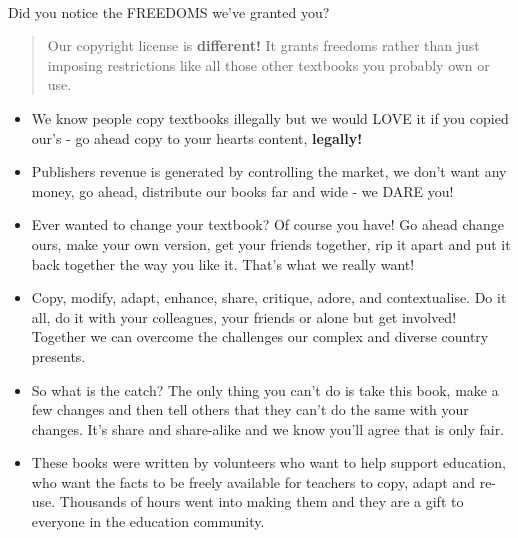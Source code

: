 \documentclass[10pt,a4paper,titlepage,twoside,openright]{report}
\begin{document}
\begin{center}
\vspace{1.cm}
\vspace{1.cm}
{\Large \\ Did you notice the FREEDOMS we've granted you?\\}
\vspace{1.cm}
\begin{quotation}{\Large Our copyright license is \textbf{different!} It grants freedoms rather than just imposing
restrictions like all those other textbooks you probably own or use.\\}\end{quotation}
{\large 
\begin{itemize} 
\item We know people copy textbooks illegally but we would LOVE it if you copied our's - 
go ahead copy to your hearts content, \textbf{legally!}
\item Publishers revenue is generated by controlling the market, we don't want any money, 
go ahead, distribute our books far and wide - we DARE you!
\item Ever wanted to change your textbook? Of course you have! Go ahead change ours, 
make your own version, get your friends together, rip it apart and put it back together 
the way you like it. That's what we really want!
\item Copy, modify, adapt, enhance, share, critique, adore, and contextualise. Do it all, 
do it with your colleagues, your friends or alone but get involved! Together we can 
overcome the challenges our complex and diverse country presents.
\item So what is the catch? The only thing you can't do is take this book, make a few changes and then tell others that they can't do the same with your changes. It's share and share-alike and we know you'll agree that is only fair.
\item These books were written by volunteers who want to help support education, who 
want the facts to be freely available for teachers to copy, adapt and re-use. Thousands 
of hours went into making them and they are a gift to everyone in the education community.
\end{itemize}
}
\end{center}



\setlength{\parskip}{1.3ex plus 0.2ex minus 0.2ex}
\setlength{\parindent}{0pt}
\end{document}
